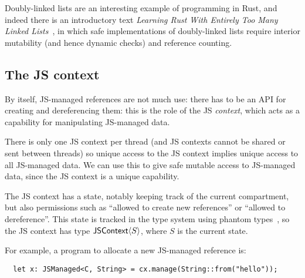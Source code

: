 Doubly-linked lists are an interesting example of programming in Rust,
and indeed there is an introductory text \emph{Learning Rust With
  Entirely Too Many Linked Lists}~\cite{too-many-lists}, in which safe
implementations of doubly-linked lists require interior mutability
(and hence dynamic checks) and reference counting.

\subsection{The JS context}

By itself, JS-managed references are not much use: there has to be an
API for creating and dereferencing them: this is the role of the
JS \emph{context}, which acts as a capability for manipulating
JS-managed data.

There is only one JS context per thread (and JS contexts cannot be shared
or sent between threads) so unique access to the JS context implies unique
access to all JS-managed data. We can use this to give safe mutable access
to JS-managed data, since the JS context is a unique capability.

The JS context has a state, notably keeping track of the current
compartment, but also permissions such as ``allowed to create new
references'' or ``allowed to dereference''.  This state is tracked in
the type system using phantom types~\cite{phantom}, so the JS context
has type $\mathsf{JSContext}\langle S\rangle$, where $S$ is the current state.

For example, a program to allocate a new JS-managed reference is:
\begin{verbatim}
  let x: JSManaged<C, String> = cx.manage(String::from("hello"));
\end{verbatim}
